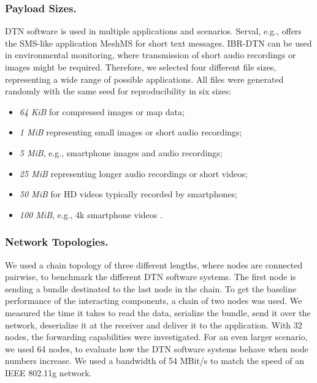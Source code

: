 
\subsubsection{Payload Sizes.}
DTN software is used in multiple applications and scenarios.
Serval, e.g., offers the SMS-like application MeshMS for short text messages.
IBR-DTN can be used in environmental monitoring, where transmission of short audio recordings or images might be required. 
Therefore, we selected four different file sizes, representing a wide range of possible applications.
All files were generated randomly with the same seed for reproducibility in six sizes:

\begin{itemize}
    \item 
\textit{64 KiB} for compressed images or map data;
\item
\textit{1 MiB} representing small images or short audio recordings;
\item
\textit{5 MiB}, e.g., smartphone images and audio recordings;
\item
\textit{25 MiB} representing longer audio recordings or short videos;
\item
\textit{50 MiB} for HD videos typically recorded by smartphones;
\item
\textit{100 MiB}, e.g., 4k smartphone videos \cite{trono2015dtn,schildt2011ibr,baumgaertner2016serval}.
\end{itemize}


\subsubsection{Network Topologies.}
We used a chain topology of three different lengths, where nodes are connected pairwise, to benchmark the different DTN software systems.
The first node is sending a bundle destinated to the last node in the chain.
To get the baseline performance of the interacting components, a chain of two nodes was used.
We measured the time it takes to read the data, serialize the bundle, send it over the network, deserialize it at the receiver and deliver it to the application.
With 32 nodes, the forwarding capabilities were investigated.
For an even larger scenario, we used 64 nodes, to evaluate how the DTN software systems behave when node numbers increase.
We used a bandwidth of 54 MBit/s to match the speed of an IEEE 802.11g network. 

